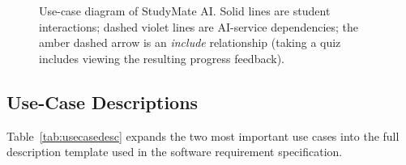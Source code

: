 \documentclass[12pt,a4paper,oneside]{report}
\begin{document}
\begin{figure}[H]
\caption{Use-case diagram of StudyMate AI. Solid lines are student interactions;
dashed violet lines are AI-service dependencies; the amber dashed arrow is an
\emph{include} relationship (taking a quiz includes viewing the resulting progress
feedback).}
\label{fig:usecase}
\end{figure}

\subsection{Use-Case Descriptions}

Table~\ref{tab:usecasedesc} expands the two most important use cases into the full description template used in the software requirement specification.
\end{document}

